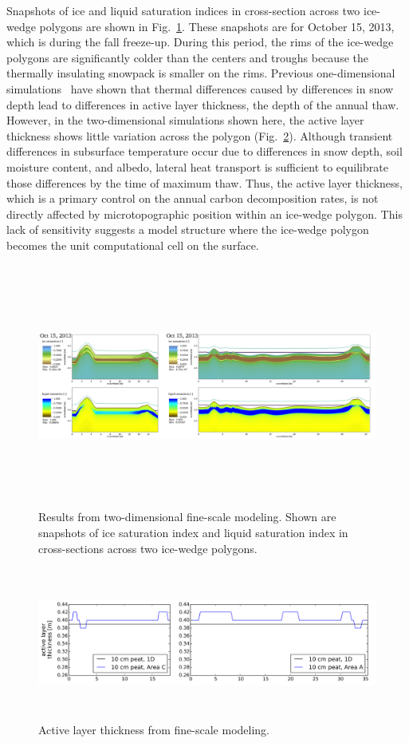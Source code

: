 \documentclass[review]{elsarticle}
\begin{document}
Snapshots of ice and liquid saturation indices in cross-section across two ice-wedge polygons are shown in Fig.~\ref{oct15}. These snapshots are for October 15, 2013, which is during the fall freeze-up. During this period, the rims of the ice-wedge polygons are significantly colder than the centers and troughs because the thermally insulating snowpack is smaller on the rims. Previous one-dimensional simulations~\cite{atchley2016} have shown that thermal differences caused by differences in snow depth lead to differences in active layer thickness, the depth of the annual thaw. However, in the two-dimensional simulations shown here, the active layer thickness shows little variation across the polygon (Fig.~\ref{alt}). Although transient differences in subsurface temperature occur due to differences in snow depth, soil moisture content, and albedo, lateral heat transport is sufficient to equilibrate those differences by the time of maximum thaw. Thus, the active layer thickness, which is a primary control on the annual carbon decomposition rates, is not directly affected by microtopographic position within an ice-wedge polygon. This lack of sensitivity suggests a model structure where the ice-wedge polygon becomes the unit computational cell on the surface. 

\begin{figure}
\centering
\includegraphics[height=8cm,width=17cm]{figures/FineScaleOct15.png}
\caption{Results from two-dimensional fine-scale modeling. Shown are snapshots of ice saturation index and liquid saturation index in cross-sections across two ice-wedge polygons.}
\label{oct15}
\end{figure}

\begin{figure}[!htpb]
\centering
\includegraphics[height=5cm, width=12cm]{figures/ALT-finescale.png}
\caption{Active layer thickness from fine-scale modeling.}
\label{alt}
\end{figure}
\end{document}
